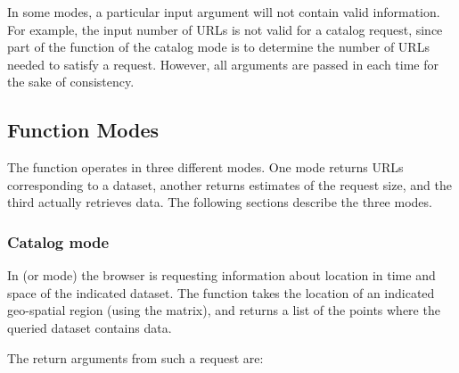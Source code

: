 In some modes, a particular input argument will not contain valid
information.  For example, the input number of URLs is not valid for a
catalog request, since part of the function of the catalog mode is
to determine the number of URLs needed to satisfy a request.  However,
all arguments are passed in each time for the sake of consistency.

\subsection{ Function Modes}

The  function operates in three different modes.  One mode
returns URLs corresponding to a dataset, another returns estimates of
the request size, and the third actually retrieves data.  The
following sections describe the three modes.

\subsubsection{Catalog mode}

In  (or  mode) the browser is requesting
information about location in time and space of the indicated dataset.
The function takes the location of an indicated geo-spatial region
(using the  matrix), and returns a list of the points
where the queried dataset contains data.

The return arguments from such a request are:



